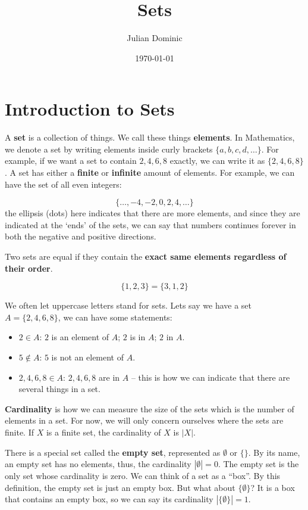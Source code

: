 \documentclass[../Latex-Setup/setup.tex]{subfiles}
\begin{document}
\title{Sets}
\author{Julian Dominic}
\date{\today}
\maketitle

\section{Introduction to Sets}

\indent A \textbf{set} is a collection of things. We call these things \textbf{elements}.
In Mathematics, we denote a set by writing elements inside curly brackets $\{a,b,c,d,\dots\}$.
For example, if we want a set to contain $2,4,6,8$ exactly, we can write it as $\{2,4,6,8\}$.
A set has either a \textbf{finite} or \textbf{infinite} amount of elements.
For example, we can have the set of all even integers:

\[\{\dots,-4,-2,0,2,4,\dots\}\]
the ellipsis (dots) here indicates that there are more elements, and since they are indicated at the `ends' of the sets,
we can say that numbers continues forever in both the negative and positive directions.\par

\indent Two sets are equal if they contain the \textbf{exact same elements regardless of their order}.

\[ \{1,2,3\} = \{3,1,2\} \]
\par

\indent We often let uppercase letters stand for sets. Lets say we have a set $A = \{2,4,6,8\}$, we can have some statements:

\begin{itemize}
    \item $2 \in A$: $2$ is an element of $A$; $2$ is in $A$; $2$ in $A$.
    \item $5 \notin A$: $5$ is not an element of $A$.
    \item $2,4,6,8 \in A$: $2,4,6,8$ are in $A$ -- this is how we can indicate that there are several things in a set.
\end{itemize}
\par

\indent \textbf{Cardinality} is how we can measure the size of the sets which is the number of elements in a set. 
For now, we will only concern ourselves where the sets are finite. If $X$ is a finite set, the cardinality of $X$ is $|X|$.\par

\indent There is a special set called the \textbf{empty set}, represented as $\emptyset$ or $\{\}$.
By its name, an empty set has no elements, thus, the cardinality $|\emptyset| = 0$. The empty set is the only set whose cardinality is zero.
We can think of a set as a ``box''. By this definition, the empty set is just an empty box. But what about $\{\emptyset\}$?
It is a box that contains an empty box, so we can say its cardinality $|\{\emptyset\}| = 1$.\par
\end{document}
